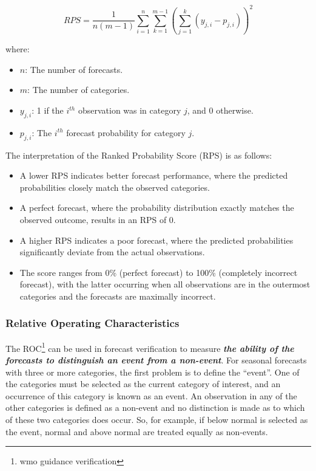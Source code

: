 \[
RPS = \frac{1}{n(m-1)} \sum_{i=1}^{n} \sum_{k=1}^{m-1} \left( \sum_{j=1}^{k} (y_{j,i} - p_{j,i}) \right)^2
\]

where:  
\begin{itemize}
    \item \( n \): The number of forecasts.  
    \item \( m \): The number of categories.  
    \item \( y_{j,i} \): 1 if the \( i^{th} \) observation was in category \( j \), and 0 otherwise.  
    \item \( p_{j,i} \): The \( i^{th} \) forecast probability for category \( j \).  
\end{itemize}

The interpretation of the Ranked Probability Score (RPS) is as follows:  
\begin{itemize}
    \item A lower RPS indicates better forecast performance, where the predicted probabilities closely match the observed categories.  
    \item A perfect forecast, where the probability distribution exactly matches the observed outcome, results in an RPS of 0.  
    \item A higher RPS indicates a poor forecast, where the predicted probabilities significantly deviate from the actual observations.  
    \item The score ranges from 0\% (perfect forecast) to 100\% (completely incorrect forecast), with the latter occurring when all observations are in the outermost categories and the forecasts are maximally incorrect.  
\end{itemize}

\subsubsection{Relative Operating Characteristics}

The ROC\footnote{wmo guidance verification} can be used in forecast verification to measure \textbf{\textit{the ability of the forecasts to distinguish an event from a non-event}}. For seasonal forecasts with three or more categories, the first problem is to define the “event”. One of the categories must be selected as the current category of interest, and an occurrence of this category is known as an event. An observation in any of the other categories is defined as a non-event and no distinction is made as to which of these two categories does occur. So, for example, if below normal is selected as the event, normal and above normal are treated equally as non-events.

